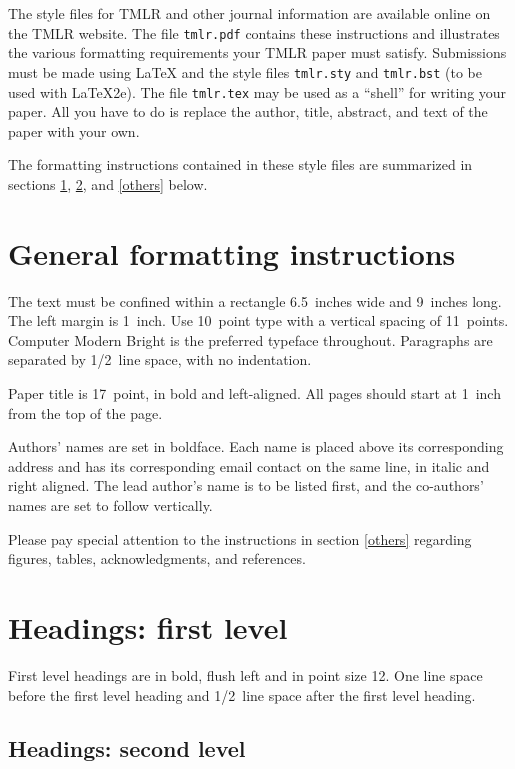 \documentclass[10pt]{article} %
\begin{document}
The style files for TMLR and other journal information are available online on the TMLR
website. The file \verb+tmlr.pdf+ contains these instructions and illustrates the various
formatting requirements your TMLR paper must satisfy. Submissions must be made using
\LaTeX{} and the style files \verb+tmlr.sty+ and \verb+tmlr.bst+ (to be used with
\LaTeX{}2e). The file \verb+tmlr.tex+ may be used as a ``shell'' for writing your paper.
All you have to do is replace the author, title, abstract, and text of the paper with your
own.

The formatting instructions contained in these style files are summarized in sections
\ref{gen_inst}, \ref{headings}, and \ref{others} below.

\section{General formatting instructions}
\label{gen_inst}

The text must be confined within a rectangle 6.5~inches wide and 9~inches long. The left
margin is 1~inch. Use 10~point type with a vertical spacing of 11~points. Computer Modern
Bright is the preferred typeface throughout. Paragraphs are separated by 1/2~line space,
with no indentation.

Paper title is 17~point, in bold and left-aligned. All pages should start at 1~inch from
the top of the page.

Authors' names are set in boldface. Each name is placed above its corresponding address and
has its corresponding email contact on the same line, in italic and right aligned. The lead
author's name is to be listed first, and the co-authors' names are set to follow
vertically.

Please pay special attention to the instructions in section \ref{others} regarding figures,
tables, acknowledgments, and references.

\section{Headings: first level}
\label{headings}

First level headings are in bold, flush left and in point size 12. One line space before
the first level heading and 1/2~line space after the first level heading.

\subsection{Headings: second level}
\end{document}
